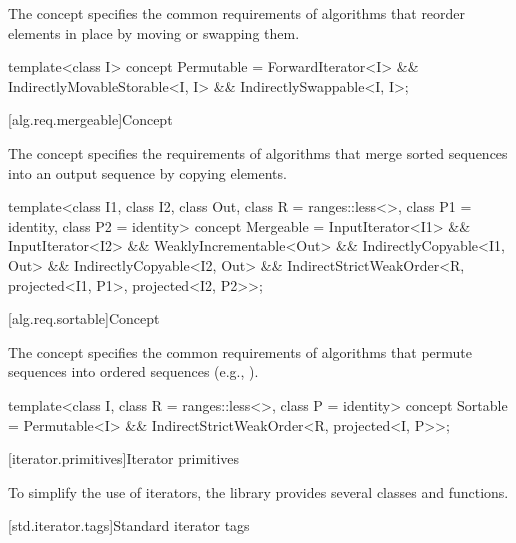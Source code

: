 \pnum
The  concept specifies the common requirements
of algorithms that reorder elements in place by moving or swapping them.

%
\begin{codeblock}
template<class I>
  concept Permutable =
    ForwardIterator<I> &&
    IndirectlyMovableStorable<I, I> &&
    IndirectlySwappable<I, I>;
\end{codeblock}

[alg.req.mergeable]{Concept }

\pnum
The  concept specifies the requirements of algorithms
that merge sorted sequences into an output sequence by copying elements.

%
\begin{codeblock}
template<class I1, class I2, class Out, class R = ranges::less<>,
         class P1 = identity, class P2 = identity>
  concept Mergeable =
    InputIterator<I1> &&
    InputIterator<I2> &&
    WeaklyIncrementable<Out> &&
    IndirectlyCopyable<I1, Out> &&
    IndirectlyCopyable<I2, Out> &&
    IndirectStrictWeakOrder<R, projected<I1, P1>, projected<I2, P2>>;
\end{codeblock}

[alg.req.sortable]{Concept }

\pnum
The  concept specifies the common requirements of
algorithms that permute sequences into ordered sequences (e.g., ).

%
\begin{codeblock}
template<class I, class R = ranges::less<>, class P = identity>
  concept Sortable =
    Permutable<I> &&
    IndirectStrictWeakOrder<R, projected<I, P>>;
\end{codeblock}

[iterator.primitives]{Iterator primitives}

\pnum
To simplify the use of iterators, the library provides
several classes and functions.

[std.iterator.tags]{Standard iterator tags}

